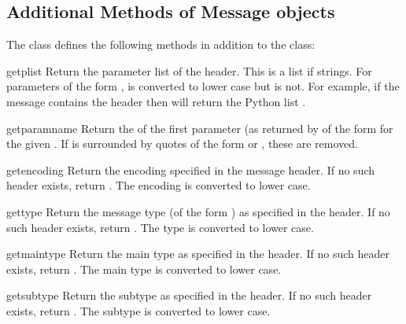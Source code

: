 \subsection{Additional Methods of Message objects}

The  class defines the following methods in
addition to the  class:


\begin{funcdesc}{getplist}{}
Return the parameter list of the  header.  This is
a list if strings.  For parameters of the form
,  is converted to lower case but
 is not.  For example, if the message contains the header
 then
 will return the Python list \code{['spam=1',
'spam=2', 'Spam']}.
\end{funcdesc}

\begin{funcdesc}{getparam}{name}
Return the  of the first parameter (as returned by
 of the form  for the
given .  If  is surrounded by quotes of the form
 or , these are removed.
\end{funcdesc}

\begin{funcdesc}{getencoding}{}
Return the encoding specified in the 
message header.  If no such header exists, return .  The
encoding is converted to lower case.
\end{funcdesc}

\begin{funcdesc}{gettype}{}
Return the message type (of the form )
as specified in the  header.  If no such header
exists, return .  The type is converted to lower
case.
\end{funcdesc}

\begin{funcdesc}{getmaintype}{}
Return the main type as specified in the  header.
If no such header exists, return .  The main type is
converted to lower case.
\end{funcdesc}

\begin{funcdesc}{getsubtype}{}
Return the subtype as specified in the  header.  If
no such header exists, return .  The subtype is
converted to lower case.
\end{funcdesc}
